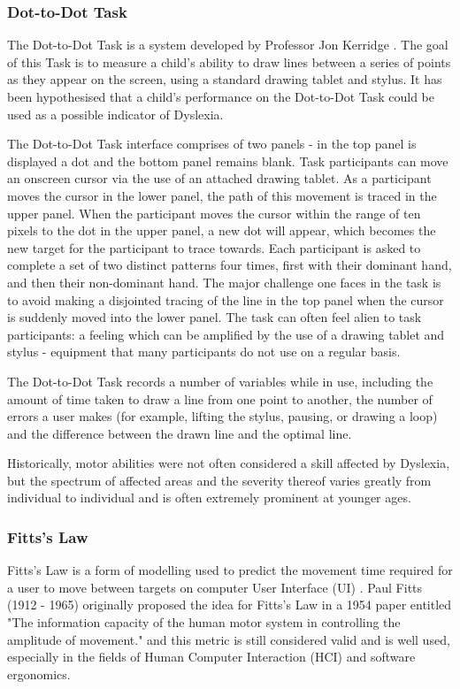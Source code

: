 		\subsubsection{Dot-to-Dot Task}
			The Dot-to-Dot Task is a system developed by Professor Jon Kerridge \cite{Willis2010, Piotrowska2015}. The goal of this Task is to measure a child’s ability to draw lines between a series of points as they appear on the screen, using a standard drawing tablet and stylus. It has been hypothesised that a child's performance on the Dot-to-Dot Task could be used as a possible indicator of Dyslexia.
	
			The Dot-to-Dot Task interface comprises of two panels - in the top panel is displayed a dot and the bottom panel remains blank. Task participants can move an onscreen cursor via the use of an attached drawing tablet. As a participant moves the cursor in the lower panel, the path of this movement is traced in the upper panel. When the participant moves the cursor within the range of ten pixels to the dot in the upper panel, a new dot will appear, which becomes the new target for the participant to trace towards. Each participant is asked to complete a set of two distinct patterns four times, first with their dominant hand, and then their non-dominant hand. The major challenge one faces in the task is to avoid making a disjointed tracing of the line in the top panel when the cursor is suddenly moved into the lower panel. The task can often feel alien to task participants: a feeling which can be amplified by the use of a drawing tablet and stylus - equipment that many participants do not use on a regular basis.
	
			The Dot-to-Dot Task records a number of variables while in use, including the amount of time taken to draw a line from one point to another, the number of errors a user makes (for example, lifting the stylus, pausing, or drawing a loop) and the difference between the drawn line and the optimal line.
	
			Historically, motor abilities were not often considered a skill affected by Dyslexia, but the spectrum of affected areas and the severity thereof varies greatly from individual to individual and is often extremely prominent at younger ages.
		
		\subsubsection{Fitts's Law}
			Fitts’s Law is a form of modelling used to predict the movement time required for a user to move between targets on computer User Interface (UI) \cite{MacKenzie1992, MacKenzie1995}. Paul Fitts (1912 - 1965) originally proposed the idea for Fitts’s Law in a 1954 paper entitled "The information capacity of the human motor system in controlling the amplitude of movement." \cite{Fitts1954} and this metric is still considered valid and is well used, especially in the fields of Human Computer Interaction (HCI) and software ergonomics.

